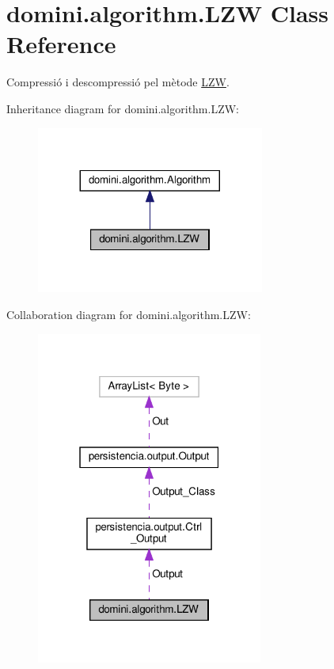 \hypertarget{classdomini_1_1algorithm_1_1LZW}{}\section{domini.\+algorithm.\+L\+ZW Class Reference}
\label{classdomini_1_1algorithm_1_1LZW}


Compressió i descompressió pel mètode \hyperlink{classdomini_1_1algorithm_1_1LZW}{L\+ZW}.  




Inheritance diagram for domini.\+algorithm.\+L\+ZW\+:\nopagebreak
\begin{figure}[H]
\begin{center}
\leavevmode
\includegraphics[width=212pt]{classdomini_1_1algorithm_1_1LZW__inherit__graph}
\end{center}
\end{figure}


Collaboration diagram for domini.\+algorithm.\+L\+ZW\+:\nopagebreak
\begin{figure}[H]
\begin{center}
\leavevmode
\includegraphics[width=211pt]{classdomini_1_1algorithm_1_1LZW__coll__graph}
\end{center}
\end{figure}
